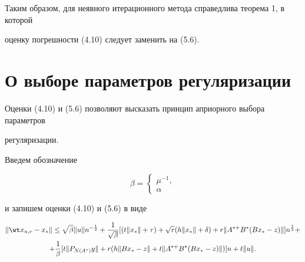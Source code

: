 Таким образом, для неявного итерационного метода справедлива теорема 1, в которой 


оценку погрешности (4.10) следует заменить на (5.6).








\section{О выборе параметров регуляризации}





Оценки (4.10) и (5.6) позволяют высказать принцип априорного выбора параметров 


регуляризации.





Введем обозначение


\begin{equation}


\beta=\begin{cases}\mu^{-1},\\ \alpha\end{cases}


\end{equation}


и запишем оценки (4.10) и (5.6) в виде


\begin{multline}


\| \wt x_{n,r}-x_*\| \le \sqrt{\beta}\|u\|n^{-\frac{1}{2}}+


\frac{1}{\sqrt {\beta}}[(t\|x_*\|+\tau)+\sqrt{r}(h\|x_*\|+\delta)+


r\|A^{*+}B^*(Bx_*-z)\|]n^{\frac{1}{2}}+\\


%


+\frac{1}{\beta}[t\|P_{N(A^*)}y\|+r(h \|Bx_*-z\|+t\|A^{*+}B^*(Bx_*-z)\|)]n+


t\|u\|.


\end{multline}








